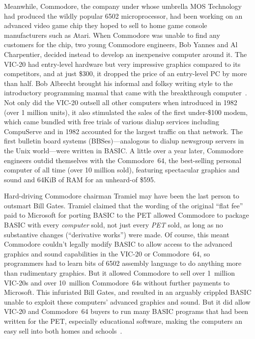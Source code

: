 Meanwhile, Commodore, the company under whose umbrella MOS Technology
had produced the wildly popular 6502 microprocessor, had been working on
an advanced video game chip they hoped to sell to home game console manufacturers
such as Atari.
When Commodore was unable to find any customers for the chip, two young
Commodore engineers, Bob Yannes and Al Charpentier, decided instead to
develop an inexpensive computer around it.
The VIC-20 had entry-level hardware but very impressive graphics
compared to its competitors, and at just \$300, it dropped the price
of an entry-level PC by more than half.
Bob Albrecht brought his informal and folksy writing style to the
introductory programming manual that came with the breakthrough
computer~\cite{commodore}.
Not only did the VIC-20 outsell all other computers when introduced in
1982 (over 1 million units), it also stimulated the sales of the first
under-\$100 modem, which came bundled with free trials of various dialup
services including CompuServe and in 1982 accounted for the largest
traffic on that network.
The first bulletin board systems (BBSes)---analogous to dialup
newsgroup servers in the Unix world---were written in BASIC.
A little over a year later, Commodore engineers outdid themselves with
the Commodore~64, the best-selling personal computer of all time (over
10 million sold), featuring spectacular graphics and sound and 64KiB
of RAM for an unheard-of \$595.

\begin{tangent}
Hard-driving Commodore chairman Tramiel may have been the last person to
outsmart Bill Gates.
Tramiel claimed that the wording of the original ``flat fee'' paid to
Microsoft for porting BASIC to the PET allowed Commodore to package
BASIC with every \emph{computer} sold, not just every \emph{PET} sold,
as long as no substantive changes (``derivative works'') were made.
Of course, this meant Commodore couldn't legally modify BASIC to allow
access to the advanced graphics and sound capabilities in the VIC-20 or
Commodore~64, so programmers had to learn bits of 6502 assembly language
to do anything more than rudimentary graphics.
But it allowed Commodore to sell over 1~million VIC-20s and over
10~million Commodore~64s without further payments to Microsoft.
This infuriated Bill Gates, and resulted in an arguably crippled BASIC
unable to exploit these computers' advanced graphics and sound.
But it did allow VIC-20 and Commodore~64 buyers to run many BASIC
programs that had been written for the PET, especially educational
software, making the computers an easy sell into both homes and
schools~\cite[p. 414]{commodore}.
\end{tangent}


